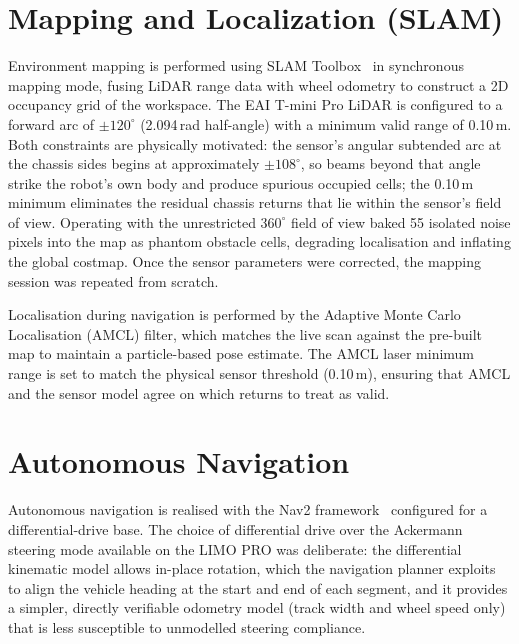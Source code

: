 \section{Mapping and Localization (SLAM)}
Environment mapping is performed using SLAM Toolbox~\cite{macenski2021slam} in
synchronous mapping mode, fusing LiDAR range data with wheel odometry to construct a
2D occupancy grid of the workspace. The EAI T-mini Pro LiDAR is configured to a
forward arc of $\pm120^{\circ}$ (2.094\,rad half-angle) with a minimum valid range
of 0.10\,m. Both constraints are physically motivated: the sensor's angular subtended
arc at the chassis sides begins at approximately $\pm108^{\circ}$, so beams beyond
that angle strike the robot's own body and produce spurious occupied cells; the 0.10\,m
minimum eliminates the residual chassis returns that lie within the sensor's field of
view. Operating with the unrestricted $360^{\circ}$ field of view baked 55 isolated
noise pixels into the map as phantom obstacle cells, degrading localisation and
inflating the global costmap. Once the sensor parameters were corrected, the mapping
session was repeated from scratch.

Localisation during navigation is performed by the Adaptive Monte Carlo Localisation
(AMCL) filter, which matches the live scan against the pre-built map to maintain a
particle-based pose estimate. The AMCL laser minimum range is set to match the physical
sensor threshold (0.10\,m), ensuring that AMCL and the sensor model agree on which
returns to treat as valid.

\section{Autonomous Navigation}
Autonomous navigation is realised with the Nav2 framework~\cite{macenski2020nav2}
configured for a differential-drive base. The choice of differential drive over the
Ackermann steering mode available on the LIMO PRO was deliberate: the differential
kinematic model allows in-place rotation, which the navigation planner exploits to
align the vehicle heading at the start and end of each segment, and it provides a
simpler, directly verifiable odometry model (track width and wheel speed only) that is
less susceptible to unmodelled steering compliance.

